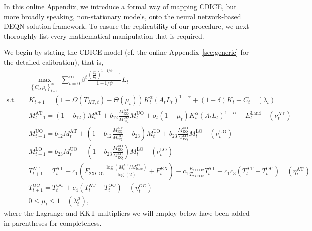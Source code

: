 \documentclass[11pt, a4paper, pdftex, twoside, dvipsnames]{article}
\renewcommand{\ref}{\cref}
\begin{document}
\begin{appendices}
In this online Appendix, we introduce a formal way of mapping CDICE, but more broadly speaking, non-stationary models, onto the neural network-based DEQN solution framework. To ensure the replicability of our procedure, we next thoroughly list every mathematical manipulation that is required. 

We begin by stating the CDICE model (cf. the online Appendix~\ref{sec:generic} for the detailed calibration), that is, 
%
\begin{align}
\label{eq:CDICE_obj}
  & \max_{\left\{C_{t}, \mu_t\right\}_{t=0}^{\infty}} \sum_{t=0}^{\infty} \beta^t
  \frac{\left(\frac{C_t}{L_t}\right)^{1-1/\psi} -1}{1-1/\psi} L_t\\
  \text{s.t.} \quad \label{eq:CDICE_kplus}
  & K_{t+1} = \left(1 - \Omega\left(T_{\text{AT},t}\right) -\Theta\left(\mu_{t}\right)\right)
    K_t^{\alpha} \left(A_{t}L_t\right)^{1-\alpha} + (1-\delta) K_t - C_{t} \quad \left(\lambda_{t}\right)  \\
  & \label{eq:CDICE_MATplus} M^{\text{AT}}_{t+1} = \left(1 - b_{12}\right) M^{\text{AT}}_{t} + b_{12} \frac{M^{\text{AT}}_{\text{EQ}}}{M^{\text{UO}}_{\text{EQ}}} M^{\text{UO}}_{t} +   \sigma_t (1-\mu_t) K_t^{\alpha} \left(A_{t}L_t\right)^{1-\alpha}  + E^{\text{Land}}_t \quad \left(\nu^{\text{AT}}_{t}\right)\\
  & \label{eq:CDICE_MUOplus} M^{\text{UO}}_{t+1} = b_{12}M^{\text{AT}}_{t} + \left(1 - b_{12} \frac{M^{\text{AT}}_{\text{EQ}}}{M^{\text{UO}}_{\text{EQ}}} - b_{23}\right)M^{\text{UO}}_{t} + b_{23} \frac{M^{\text{UO}}_{\text{EQ}}}{M^{\text{LO}}_{\text{EQ}}}  M^{\text{LO}}_{t} \quad \left(\nu^{\text{UO}}_{t}\right)  \\
  & \label{eq:CDICE_MLOplus} M^{\text{LO}}_{t+1} = b_{23}M^{\text{UO}}_{t} + \left(1 - b_{23} \frac{M^{\text{UO}}_{\text{EQ}}}{M^{\text{LO}}_{\text{EQ}}} \right)M^{\text{LO}}_{t} \quad \left(\nu^{\text{LO}}_{t}\right)\\
  & \label{eq:CDICE_TATplus} T^{\text{AT}}_{t+1} = T^{\text{AT}}_{t} + c_1 \left(F_{\text{2XCO2}} \frac{\log(M^{\text{AT}}_{t}/M^{\text{AT}}_{\text{base}})}{\log(2)} + F^{EX}_{t} \right)  - c_1 \frac{F_{\text{2XCO2}}}{T_{\text{2XCO2}}}T^{\text{AT}}_{t}- c_1c_3 \left(T^{\text{AT}}_{t}-T^{\text{OC}}_{t}\right) \quad \left(\eta^{\text{AT}}_{t}\right)\\
&    \label{eq:CDICE_TOCplus} T^{\text{OC}}_{t+1} = T^{\text{OC}}_{t} + c_4 \left(T^{\text{AT}}_{t}  - T^{\text{OC}}_{t}\right) \quad \left(\eta^{\text{OC}}_{t}\right)\\
  & \label{eq:CDICE_mu_range} 0 \leq \mu_t \leq 1 \quad \left( \lambda^{\mu}_{t} \right),
\end{align}
%
where the Lagrange and KKT multipliers we will employ below have been added in parentheses for completeness. 



\end{appendices}
\end{document}
